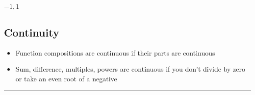 \documentclass[letterpaper]{article}
\begin{document}
\(\boxed{-1, 1}\)

\subsection{Continuity}
\label{sec:org20b63c4}
\begin{itemize}
\item Function compositions are continuous if their parts are continuous
\item Sum, difference, multiples, powers are continuous if you don't divide
by zero or take an even root of a negative
\end{itemize}

\noindent\rule{\textwidth}{0.5pt}
\end{document}
